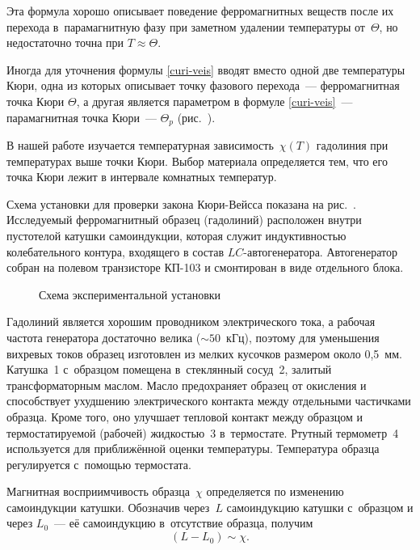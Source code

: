 Эта формула хорошо описывает поведение ферромагнитных веществ после их перехода в~парамагнитную фазу при заметном
удалении температуры от~$\Theta$, но недостаточно точна при $T\approx \Theta$.

Иногда для уточнения формулы \eqref{curi-veis} вводят вместо одной две температуры Кюри, одна из которых описывает точку фазового
перехода~--- ферромагнитная точка Кюри $\Theta$, а другая является параметром в формуле \eqref{curi-veis}~--- парамагнитная точка
Кюри~--- $\Theta_p$ (рис.~).

В нашей работе изучается температурная зависимость~$\chi(T)$ гадолиния при температурах выше точки Кюри. Выбор материала
определяется тем, что его точка Кюри лежит в интервале комнатных температур.

\experiment

Схема установки для проверки закона Кюри-Вейсса показана на рис.~. Исследуемый ферромагнитный образец (гадолиний)
расположен внутри пустотелой катушки самоиндукции, которая служит индуктивностью колебательного контура, входящего в
состав $LC$-автогенератора. Автогенератор собран на полевом транзисторе КП-103 и смонтирован в виде отдельного блока.

\begin{figure}
	\caption{Схема экспериментальной установки}
\end{figure}

Гадолиний является хорошим проводником электрического тока, а рабочая частота генератора достаточно велика
(${\sim}50$~кГц), поэтому для уменьшения вихревых токов образец изготовлен из мелких кусочков размером около 0,5~мм.
Катушка~1 с~образцом помещена в~стеклянный сосуд~2, залитый трансформаторным маслом. Масло предохраняет образец от
окисления и способствует ухудшению электрического контакта между отдельными частичками образца. Кроме того, оно улучшает
тепловой контакт между образцом и термостатируемой (рабочей) жидкостью~3 в~термостате. Ртутный термометр~4 используется
для приближённой оценки температуры. Температура образца регулируется с~помощью термостата.%

Магнитная восприимчивость образца~$\chi$ определяется по изменению самоиндукции катушки. Обозначив через~$L$
самоиндукцию катушки с~образцом и через $L_0$~--- её самоиндукцию в~отсутствие образца, получим
\begin{equation}%
	(L-L_0)\sim\chi.
\end{equation}

